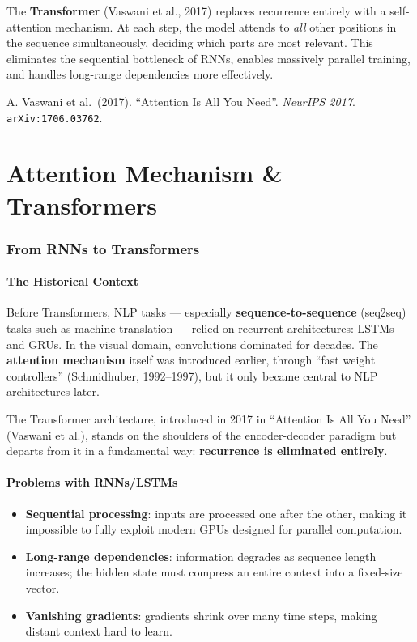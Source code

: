 \documentclass[11pt,a4paper]{article}
\theoremstyle{definition}
\theoremstyle{plain}
\theoremstyle{remark}
\begin{document}
The \textbf{Transformer} (Vaswani et al., 2017) replaces recurrence entirely with a self-attention mechanism. At each step, the model attends to \emph{all} other positions in the sequence simultaneously, deciding which parts are most relevant. This eliminates the sequential bottleneck of RNNs, enables massively parallel training, and handles long-range dependencies more effectively.

\begin{tcolorbox}[colback=blue!5!white,colframe=blue!60!black,title={Reference}]
A. Vaswani et al.\ (2017). ``Attention Is All You Need''. \textit{NeurIPS 2017}. \texttt{arXiv:1706.03762}.
\end{tcolorbox}


\part{Attention Mechanism \& Transformers}

\section{From RNNs to Transformers}

\subsection{The Historical Context}

Before Transformers, NLP tasks --- especially \textbf{sequence-to-sequence} (seq2seq) tasks such as machine translation --- relied on recurrent architectures: LSTMs and GRUs. In the visual domain, convolutions dominated for decades. The \textbf{attention mechanism} itself was introduced earlier, through ``fast weight controllers'' (Schmidhuber, 1992--1997), but it only became central to NLP architectures later.

The Transformer architecture, introduced in 2017 in ``Attention Is All You Need'' (Vaswani et al.), stands on the shoulders of the encoder-decoder paradigm but departs from it in a fundamental way: \textbf{recurrence is eliminated entirely}.

\subsection{Problems with RNNs/LSTMs}

\begin{itemize}
    \item \textbf{Sequential processing}: inputs are processed one after the other, making it impossible to fully exploit modern GPUs designed for parallel computation.
    \item \textbf{Long-range dependencies}: information degrades as sequence length increases; the hidden state must compress an entire context into a fixed-size vector.
    \item \textbf{Vanishing gradients}: gradients shrink over many time steps, making distant context hard to learn.
\end{itemize}
\end{document}
